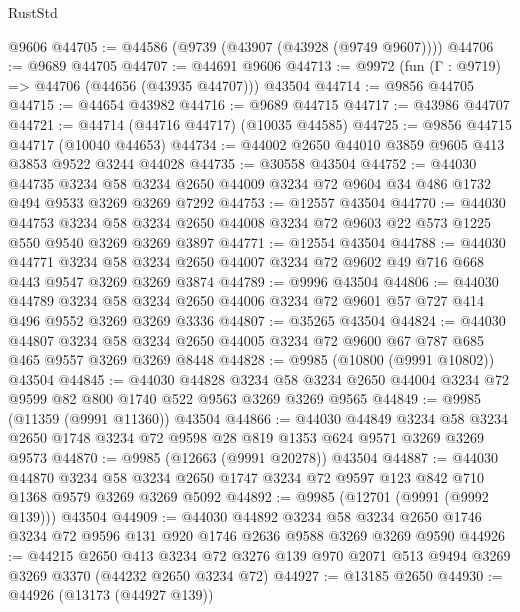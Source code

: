 \begin{lexlean}{RustStd}
\begin{coremodule}
    @9606
@44705 := @44586 (@9739 (@43907 (@43928 (@9749 @9607))))
@44706 := @9689 @44705
@44707 := @44691 @9606
@44713 := @9972 (fun (Γ : @9719) => @44706 (@44656 (@43935 @44707))) @43504
@44714 := @9856 @44705
@44715 := @44654 @43982
@44716 := @9689 @44715
@44717 := @43986 @44707
@44721 := @44714 (@44716 @44717) (@10035 @44585)
@44725 := @9856 @44715 @44717 (@10040 @44653)
@44734 := @44002 @2650 @44010 @3859 @9605 @413 @3853 @9522 @3244 @44028
@44735 := @30558 @43504
@44752 := @44030
    @44735
    @3234
    @58
    @3234
    @2650
    @44009
    @3234
    @72
    @9604
    @34
    @486
    @1732
    @494
    @9533
    @3269
    @3269
    @7292
@44753 := @12557 @43504
@44770 := @44030
    @44753
    @3234
    @58
    @3234
    @2650
    @44008
    @3234
    @72
    @9603
    @22
    @573
    @1225
    @550
    @9540
    @3269
    @3269
    @3897
@44771 := @12554 @43504
@44788 := @44030
    @44771
    @3234
    @58
    @3234
    @2650
    @44007
    @3234
    @72
    @9602
    @49
    @716
    @668
    @443
    @9547
    @3269
    @3269
    @3874
@44789 := @9996 @43504
@44806 := @44030
    @44789
    @3234
    @58
    @3234
    @2650
    @44006
    @3234
    @72
    @9601
    @57
    @727
    @414
    @496
    @9552
    @3269
    @3269
    @3336
@44807 := @35265 @43504
@44824 := @44030
    @44807
    @3234
    @58
    @3234
    @2650
    @44005
    @3234
    @72
    @9600
    @67
    @787
    @685
    @465
    @9557
    @3269
    @3269
    @8448
@44828 := @9985 (@10800 (@9991 @10802)) @43504
@44845 := @44030
    @44828
    @3234
    @58
    @3234
    @2650
    @44004
    @3234
    @72
    @9599
    @82
    @800
    @1740
    @522
    @9563
    @3269
    @3269
    @9565
@44849 := @9985 (@11359 (@9991 @11360)) @43504
@44866 := @44030
    @44849
    @3234
    @58
    @3234
    @2650
    @1748
    @3234
    @72
    @9598
    @28
    @819
    @1353
    @624
    @9571
    @3269
    @3269
    @9573
@44870 := @9985 (@12663 (@9991 @20278)) @43504
@44887 := @44030
    @44870
    @3234
    @58
    @3234
    @2650
    @1747
    @3234
    @72
    @9597
    @123
    @842
    @710
    @1368
    @9579
    @3269
    @3269
    @5092
@44892 := @9985 (@12701 (@9991 (@9992 @139))) @43504
@44909 := @44030
    @44892
    @3234
    @58
    @3234
    @2650
    @1746
    @3234
    @72
    @9596
    @131
    @920
    @1746
    @2636
    @9588
    @3269
    @3269
    @9590
@44926 := @44215
    @2650
    @413
    @3234
    @72
    @3276
    @139
    @970
    @2071
    @513
    @9494
    @3269
    @3269
    @3370
    (@44232 @2650 @3234 @72)
@44927 := @13185 @2650
@44930 := @44926 (@13173 (@44927 @139))

\end{coremodule}
\end{lexlean}
